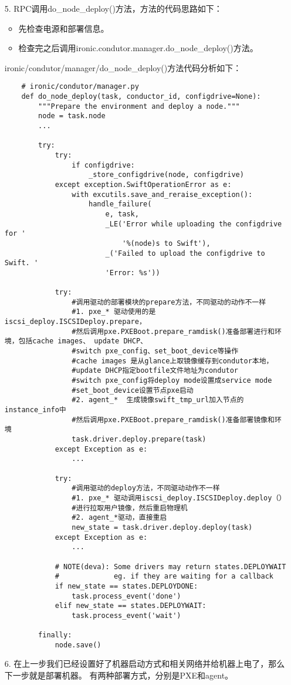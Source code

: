 \documentclass[a4paper,left=2.5cm,right=2.5cm,11pt]{article}
\begin{document}
\begin{itemize}
		\item[5.] RPC调用do\_node\_deploy()方法，方法的代码思路如下：
		\begin{itemize}
			\item 先检查电源和部署信息。
			\item 检查完之后调用ironic.condutor.manager.do\_node\_deploy()方法。
		\end{itemize}

		ironic/condutor/manager/do\_node\_deploy()方法代码分析如下：
		\begin{lstlisting}
	# ironic/condutor/manager.py
	def do_node_deploy(task, conductor_id, configdrive=None):
		"""Prepare the environment and deploy a node."""
		node = task.node
		...

		try:
			try:
				if configdrive:
					_store_configdrive(node, configdrive)
			except exception.SwiftOperationError as e:
				with excutils.save_and_reraise_exception():
					handle_failure(
						e, task,
						_LE('Error while uploading the configdrive for '
							'%(node)s to Swift'),
						_('Failed to upload the configdrive to Swift. '
						'Error: %s'))

			try:
				#调用驱动的部署模块的prepare方法，不同驱动的动作不一样
				#1. pxe_* 驱动使用的是iscsi_deploy.ISCSIDeploy.prepare，
				#然后调用pxe.PXEBoot.prepare_ramdisk()准备部署进行和环境，包括cache images、 update DHCP、
				#switch pxe_config、set_boot_device等操作
				#cache images 是从glance上取镜像缓存到condutor本地，
				#update DHCP指定bootfile文件地址为condutor
				#switch pxe_config将deploy mode设置成service mode
				#set_boot_device设置节点pxe启动
				#2. agent_*  生成镜像swift_tmp_url加入节点的instance_info中
				#然后调用pxe.PXEBoot.prepare_ramdisk()准备部署镜像和环境
				task.driver.deploy.prepare(task)
			except Exception as e:
				...

			try:
				#调用驱动的deploy方法，不同驱动动作不一样
				#1. pxe_* 驱动调用iscsi_deploy.ISCSIDeploy.deploy（）
				#进行拉取用户镜像，然后重启物理机
				#2. agent_*驱动，直接重启
				new_state = task.driver.deploy.deploy(task)
			except Exception as e:
				...

			# NOTE(deva): Some drivers may return states.DEPLOYWAIT
			#             eg. if they are waiting for a callback
			if new_state == states.DEPLOYDONE:
				task.process_event('done')
			elif new_state == states.DEPLOYWAIT:
				task.process_event('wait')

		finally:
			node.save()
		\end{lstlisting}

		\item[6.] 在上一步我们已经设置好了机器启动方式和相关网络并给机器上电了，那么下一步就是部署机器。
		有两种部署方式，分别是PXE和agent。
	\end{itemize}
\end{document}
